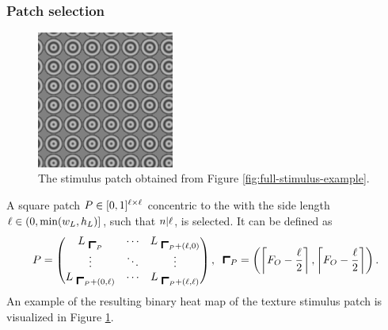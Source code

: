 \subsubsection{Patch selection}
\label{sec:patch-selection}

\begin{figure}
    \centering
    \includegraphics[width=0.4\textwidth]{src/assets/images/stimulus-patch.png}
    \caption[Stimulus patch]{The stimulus patch obtained from Figure \ref{fig:full-stimulus-example}.}
    \label{fig:stim-patch-example}
\end{figure}

A square patch $P \in [0, 1]^{\ell \times \ell}$ concentric to the \stimfig{} with the side length $\ell \in (0, \min(w_L, h_L)]$,  such that $n | \ell$, is selected. It can be defined as
\begin{equation}
    \patchmatrix =
    \begin{pmatrix}
        \fullmatrix_{\ \patchstart} & \cdots  & \fullmatrix_{\ \patchstart + (\patchsize, 0)}  \\
        \vdots & \ddots & \vdots  \\
        \fullmatrix_{\ \patchstart + (0, \patchsize)} & \cdots  &  \fullmatrix_{\ \patchstart + (\patchsize, \patchsize)}
    \end{pmatrix}, \;\
    \patchstart = \left( \ceil{ \figcenter - \frac{\patchsize}{2}}, \ceil{  \figcenter - \frac{\patchsize}{2} } \right).
\end{equation}
An example of the resulting binary heat map of the texture stimulus patch is visualized in Figure \ref{fig:stim-patch-example}.






